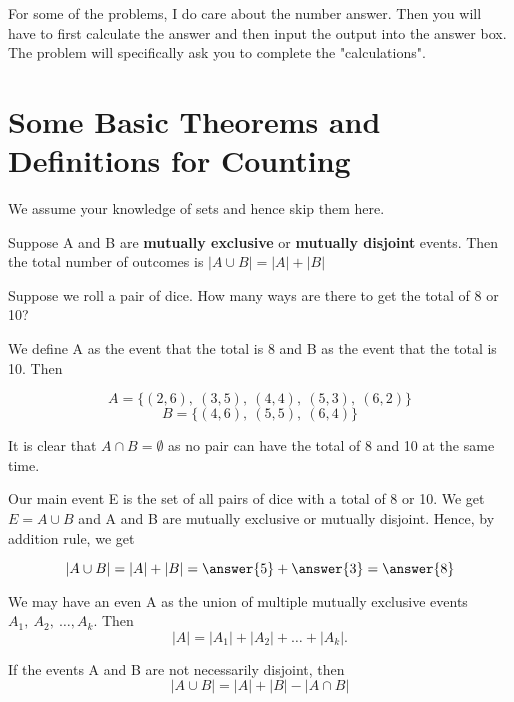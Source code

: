 \documentclass{ximera}
\begin{document}
\hspace{1cm}

For some of the problems, I do care about the number answer. Then you will have to first calculate the answer and then input the output into the answer box. The problem will specifically ask you to complete the "calculations".

\section*{Some Basic Theorems and Definitions for Counting}

We assume your knowledge of sets and hence skip them here.

\begin{theorem}
Suppose A and B are \textbf{mutually exclusive} or \textbf{mutually disjoint}  events. Then the total number of outcomes is $|A\cup B|=|A|+|B|$
\end{theorem}

\begin{example}
Suppose we roll a pair of dice. How many ways are there to get the total of 8 or 10?

\begin{explanation}
We define A as the event that the total is 8 and B as the event that the total is 10. Then 

$$A=\{(2,6),~(3,5),~(4,4),~(5,3),~(6,2)\}$$
$$B=\{(4,6),~(5,5),~(6,4)\}$$

It is clear that $A\cap B=\emptyset$ as no pair can have the total of 8 and 10 at the same time.

Our main event E is the set of all pairs of dice with a total of 8 or 10. We get $E=A\cup B$ and A and B are mutually exclusive or mutually disjoint. Hence, by addition rule, we get

$$|A\cup B|=|A|+|B|=\answer{5}+\answer{3}=\answer{8}$$
\end{explanation}

\begin{remark}
We may have an even A as the union of multiple mutually exclusive events $A_1,~ A_2, ~\ldots, A_k$. Then 
$$|A|=|A_1|+|A_2|+\ldots+|A_k|.$$
\end{remark}

\begin{remark}
If the events A and B are not necessarily disjoint, then 
$$|A\cup B|=|A|+|B|-|A\cap B|$$
\end{remark}
\end{example}
\end{document}
